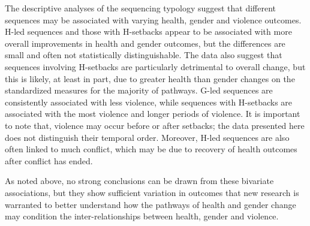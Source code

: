 \documentclass[12pt]{article}
\begin{document}
The descriptive analyses of the sequencing typology suggest that different sequences may be associated with varying health, gender and violence outcomes.
H-led sequences and those with H-setbacks appear to be associated with more overall improvements in health and gender outcomes, but the differences are small and often not statistically distinguishable.
The data also suggest that sequences involving H-setbacks are particularly detrimental to overall change, but this is likely, at least in part, due to greater health than gender changes on the standardized measures for the majority of pathways.
G-led sequences are consistently associated with less violence, while sequences with H-setbacks are associated with the most violence and longer periods of violence.
It is important to note that, violence may occur before or after setbacks; the data presented here does not distinguish their temporal order.
Moreover, H-led sequences are also often linked to much conflict, which may be due to recovery of health outcomes after conflict has ended.

As noted above, no strong conclusions can be drawn from these bivariate associations, but they show sufficient variation in outcomes that new research is warranted to better understand how the pathways of health and gender change may condition the inter-relationships between health, gender and violence.



\end{document}
